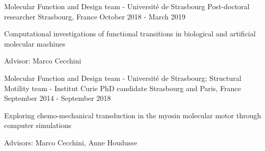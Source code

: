 \begin{cventries}
  \cventry
   {Molecular Function and Design team - Université de Strasbourg}
   {Post-doctoral researcher}
   {Strasbourg, France}
   {October 2018 - March 2019}
   {
   	 \begin{cvitems}
   	 	\item Computational investigations of functional transitions in biological and artificial molecular machines
   	 	\item Advisor: Marco Cecchini
   	 	\vspace{\cvvertspace}
	\end{cvitems}
}
  \cventry
   {Molecular Function and Design team - Université de Strasbourg; Structural Motility team - Institut Curie}
   {PhD candidate}
   {Strasbourg and Paris, France}
   {September 2014 - September 2018}
   {
   	\begin{cvitems}
   		\item Exploring chemo-mechanical transduction in the myosin molecular motor through computer simulations
   		\item Advisors: Marco Cecchini, Anne Houdusse
   		\vspace{\cvvertspace}
   	\end{cvitems}
}




\end{cventries}
